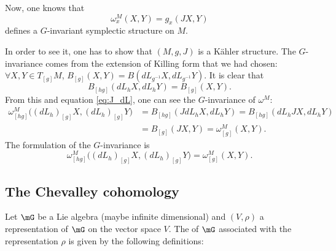Now, one knows that
\begin{equation}
  \omega^M_x(X,Y)=g_x(JX,Y)
\end{equation}
defines a $G$-invariant symplectic structure on $M$.

In order to see it, one has to show that $(M,g,J)$ is  a Kähler structure. The $G$-invariance comes from the extension of Killing form that we had chosen: $\forall X,Y\in T_{[g]}M$, $B_{[g]}(X,Y)=B(dL_{g^{-1}}X,dL_{g^{-1}}Y)$.
It is clear that
\begin{equation}
B_{[hg]}(dL_hX,dL_hY)=B_{[g]}(X,Y).
\end{equation}
From this and equation \eqref{eq:J_dL}, one can see the $G$-invariance of $\omega^M$:
\begin{equation}
\begin{split}
   \omega^M_{[hg]}\big((dL_h)_{[g]}X, (dL_h)_{[g]}Y\big)&=B_{[hg]}(JdL_hX,dL_hY)
                                                =B_{[hg]}(dL_h J X,dL_hY)\\
						&=B_{[g]}(JX,Y)
						=\omega^M_{[g]}(X,Y).
\end{split}
\end{equation}
The formulation of the $G$-invariance is
\begin{equation}
   \omega^M_{[hg]}\Big( (dL_h)_{[g]}X, (dL_h)_{[g]}Y \Big)=\omega^M_{[g]}(X,Y).
\end{equation}

\subsection{The Chevalley cohomology}

Let $\mG$ be a Lie algebra (maybe infinite dimensional) and $(V,\rho)$ a representation of $\mG$ on the vector space $V$. The  of $\mG$ associated with the representation $\rho$ is given by the following definitions:

